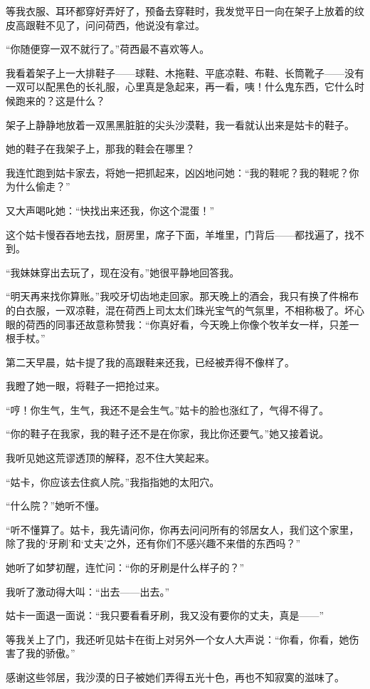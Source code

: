 \par 等我衣服、耳环都穿好弄好了，预备去穿鞋时，我发觉平日一向在架子上放着的纹皮高跟鞋不见了，问问荷西，他说没有拿过。
\par “你随便穿一双不就行了。”荷西最不喜欢等人。
\par 我看着架子上一大排鞋子——球鞋、木拖鞋、平底凉鞋、布鞋、长筒靴子——没有一双可以配黑色的长礼服，心里真是急起来，再一看，咦！什么鬼东西，它什么时候跑来的？这是什么？
\par 架子上静静地放着一双黑黑脏脏的尖头沙漠鞋，我一看就认出来是姑卡的鞋子。
\par 她的鞋子在我架子上，那我的鞋会在哪里？
\par 我连忙跑到姑卡家去，将她一把抓起来，凶凶地问她：“我的鞋呢？我的鞋呢？你为什么偷走？”
\par 又大声喝叱她：“快找出来还我，你这个混蛋！”
\par 这个姑卡慢吞吞地去找，厨房里，席子下面，羊堆里，门背后——都找遍了，找不到。
\par “我妹妹穿出去玩了，现在没有。”她很平静地回答我。
\par “明天再来找你算账。”我咬牙切齿地走回家。那天晚上的酒会，我只有换了件棉布的白衣服，一双凉鞋，混在荷西上司太太们珠光宝气的气氛里，不相称极了。坏心眼的荷西的同事还故意称赞我：“你真好看，今天晚上你像个牧羊女一样，只差一根手杖。”
\par 第二天早晨，姑卡提了我的高跟鞋来还我，已经被弄得不像样了。
\par 我瞪了她一眼，将鞋子一把抢过来。
\par “哼！你生气，生气，我还不是会生气。”姑卡的脸也涨红了，气得不得了。
\par “你的鞋子在我家，我的鞋子还不是在你家，我比你还要气。”她又接着说。
\par 我听见她这荒谬透顶的解释，忍不住大笑起来。
\par “姑卡，你应该去住疯人院。”我指指她的太阳穴。
\par “什么院？”她听不懂。
\par “听不懂算了。姑卡，我先请问你，你再去问问所有的邻居女人，我们这个家里，除了我的‘牙刷’和‘丈夫’之外，还有你们不感兴趣不来借的东西吗？”
\par 她听了如梦初醒，连忙问：“你的牙刷是什么样子的？”
\par 我听了激动得大叫：“出去——出去。”
\par 姑卡一面退一面说：“我只要看看牙刷，我又没有要你的丈夫，真是——”
\par 等我关上了门，我还听见姑卡在街上对另外一个女人大声说：“你看，你看，她伤害了我的骄傲。”
\par 感谢这些邻居，我沙漠的日子被她们弄得五光十色，再也不知寂寞的滋味了。


